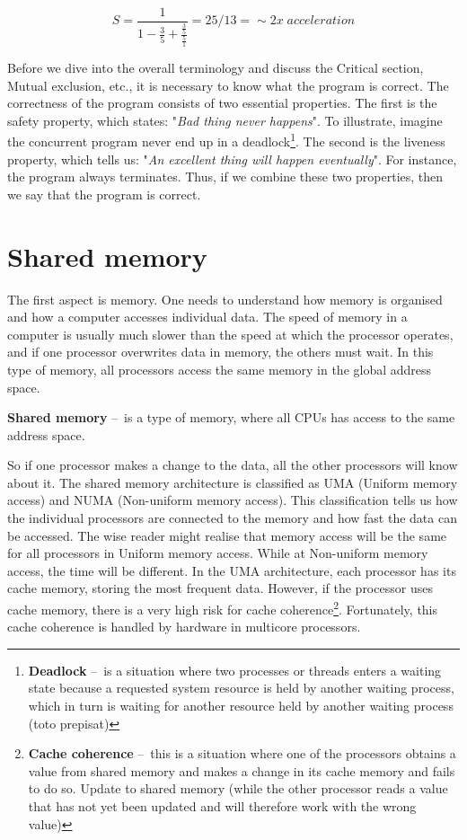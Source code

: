 \begin{equation}
    \label{eqn:amdalhinpractice}
    S = \frac{1}{1 - \frac{3}{5} + \frac{\frac{3}{5}}{\frac{5}{1}}} = 25/13 =\sim 2x \; acceleration
    \tag{2}
\end{equation}

Before we dive into the overall terminology and discuss the Critical section, Mutual exclusion, etc., it is necessary to know what the program is correct. The correctness of the program consists of two essential properties. The first is the safety property, which states: "\emph{Bad thing never happens}". To illustrate, imagine the concurrent program never end up in a deadlock\footnote{\textbf{Deadlock} \---\ is a situation where two processes or threads enters a waiting state because a requested system resource is held by another waiting process, which in turn is waiting for another resource held by another waiting process (toto prepisat)}. The second is the liveness property, which tells us: "\emph{An excellent thing will happen eventually}". For instance, the program always terminates. Thus, if we combine these two properties, then we say that the program is correct.

\section{Shared memory}
\label{04:sharedmemory}

The first aspect is memory. One needs to understand how memory is organised and how a computer accesses individual data. The speed of memory in a computer is usually much slower than the speed at which the processor operates, and if one processor overwrites data in memory, the others must wait. In this type of memory, all processors access the same memory in the global address space.
\begin{definition}
    \textbf{Shared memory} \---\ is a type of memory, where all CPUs has access to the same address space.
\end{definition}
So if one processor makes a change to the data, all the other processors will know about it. The shared memory architecture is classified as UMA (Uniform memory access) and NUMA (Non-uniform memory access). This classification tells us how the individual processors are connected to the memory and how fast the data can be accessed. The wise reader might realise that memory access will be the same for all processors in Uniform memory access. While at Non-uniform memory access, the time will be different. In the UMA architecture, each processor has its cache memory, storing the most frequent data. However, if the processor uses cache memory, there is a very high risk for cache coherence\footnote {\textbf{Cache coherence} \---\ this is a situation where one of the processors obtains a value from shared memory and makes a change in its cache memory and fails to do so. Update to shared memory (while the other processor reads a value that has not yet been updated and will therefore work with the wrong value)}. Fortunately, this cache coherence is handled by hardware in multicore processors.

